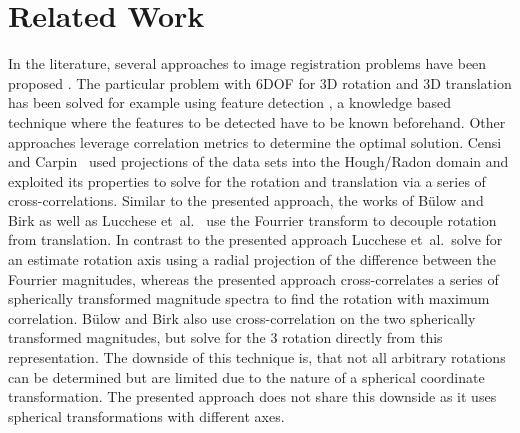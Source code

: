 \section{Related Work}

In the literature, several approaches to image registration problems have been proposed \cite{Brown92imageregistration}.
The particular problem with 6DOF for 3D rotation and 3D translation has been solved for example using feature detection \cite{wang1996_CT_markers}, a knowledge based technique where the features to be detected have to be known beforehand.
Other approaches leverage correlation metrics to determine the optimal solution.
Censi and Carpin~\cite{censi09houghradon} used projections of the data sets into the Hough/Radon domain and exploited its properties to solve for the rotation and translation via a series of cross-correlations.
Similar to the presented approach, the works of B\"ulow and Birk \cite{bulow13dof6registration} as well as Lucchese et~al.\ \cite{lucchese02rangedatareg} use the Fourrier transform to decouple rotation from translation.
In contrast to the presented approach Lucchese et~al.\ solve for an estimate rotation axis using a radial projection of the difference between the Fourrier magnitudes, whereas the presented approach cross-correlates a series of spherically transformed magnitude spectra to find the rotation with maximum correlation.
B\"ulow and Birk also use cross-correlation on the two spherically transformed magnitudes, but solve for the 3 rotation directly from this representation.
The downside of this technique is, that not all arbitrary rotations can be determined but are limited due to the nature of a spherical coordinate transformation.
The presented approach does not share this downside as it uses spherical transformations with different axes.